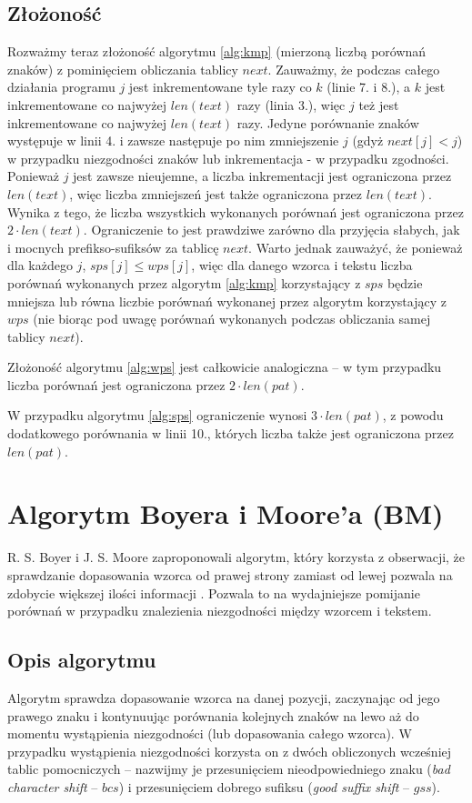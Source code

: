 \subsection{Złożoność}
Rozważmy teraz złożoność algorytmu \ref{alg:kmp} (mierzoną liczbą porównań znaków) z pominięciem obliczania tablicy $next$. Zauważmy, że podczas całego działania programu $j$ jest inkrementowane tyle razy co $k$ (linie 7. i 8.), a $k$ jest inkrementowane co najwyżej $len(text)$ razy (linia 3.), więc $j$ też jest inkrementowane co najwyżej $len(text)$ razy. Jedyne porównanie znaków występuje w linii 4. i zawsze następuje po nim zmniejszenie $j$ (gdyż $next[j] < j$) w przypadku niezgodności znaków lub inkrementacja - w przypadku zgodności. Ponieważ $j$ jest zawsze nieujemne, a liczba inkrementacji jest ograniczona przez $len(text)$, więc liczba zmniejszeń jest także ograniczona przez $len(text)$. Wynika z tego, że liczba wszystkich wykonanych porównań jest ograniczona przez $2 \cdot len(text)$. Ograniczenie to jest prawdziwe zarówno dla przyjęcia słabych, jak i mocnych prefikso-sufiksów za tablicę $next$. Warto jednak zauważyć, że ponieważ dla każdego $j$, $sps[j] \leq wps[j]$, więc dla danego wzorca i tekstu liczba porównań wykonanych przez algorytm \ref{alg:kmp} korzystający z $sps$ będzie mniejsza lub równa liczbie porównań wykonanej przez algorytm korzystający z $wps$ (nie biorąc pod uwagę porównań wykonanych podczas obliczania samej tablicy $next$).

Złożoność algorytmu \ref{alg:wps} jest całkowicie analogiczna -- w tym przypadku liczba porównań jest ograniczona przez $2 \cdot len(pat)$.

W przypadku algorytmu \ref{alg:sps} ograniczenie wynosi $3 \cdot len(pat)$, z powodu dodatkowego porównania w linii 10., których liczba także jest ograniczona przez $len(pat)$.

\newpage
\section{Algorytm Boyera i Moore’a (BM)}
R. S. Boyer i J. S. Moore zaproponowali algorytm, który korzysta z obserwacji, że sprawdzanie dopasowania wzorca od prawej strony zamiast od lewej pozwala na zdobycie większej ilości informacji \cite{BM}. Pozwala to na wydajniejsze pomijanie porównań w przypadku znalezienia niezgodności między wzorcem i tekstem.  

\subsection{Opis algorytmu}
Algorytm sprawdza dopasowanie wzorca na danej pozycji, zaczynając od jego prawego znaku i kontynuując porównania kolejnych znaków na lewo aż do momentu wystąpienia niezgodności (lub dopasowania całego wzorca). W przypadku wystąpienia niezgodności korzysta on z dwóch obliczonych wcześniej tablic pomocniczych -- nazwijmy je przesunięciem nieodpowiedniego znaku (\textit{bad character shift} -- $bcs$) i przesunięciem dobrego sufiksu (\textit{good suffix shift} -- $gss$). 

